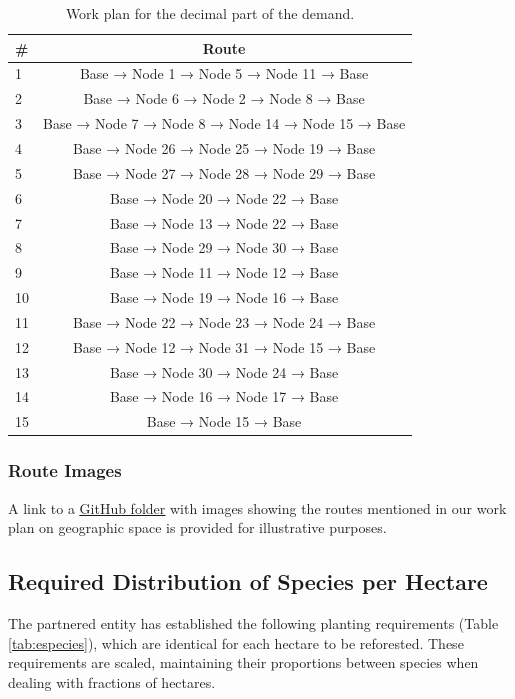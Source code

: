 \documentclass{amsart}
\begin{document}
        
        \begin{table}[!htp]\centering
        \scriptsize
        \begin{tabular}{lc} \toprule
        \textbf{\#} & \textbf{Route} \\\midrule
        1 & Base → Node 1 → Node 5 → Node 11 → Base \\
        2 & Base → Node 6  → Node 2 → Node 8 → Base \\
        3 & Base → Node 7 → Node 8 → Node 14 → Node 15 → Base \\
        4 & Base → Node 26 → Node 25 → Node 19 → Base \\
        5 & Base → Node 27 → Node 28 → Node 29 → Base \\
        6 & Base → Node 20 → Node 22 → Base \\
        7 & Base → Node 13 → Node 22 → Base \\
        8 & Base → Node 29 → Node 30 → Base \\
        9 & Base → Node 11 → Node 12 → Base \\
        10 & Base → Node 19 → Node 16 → Base \\
        11 & Base → Node 22 → Node 23 → Node 24 → Base \\
        12 & Base → Node 12 → Node 31 → Node 15 → Base \\
        13 & Base → Node 30 → Node 24 → Base \\
        14 & Base → Node 16 → Node 17 → Base \\
        15 & Base → Node 15 → Base \\
        \bottomrule
        \end{tabular}
        \vspace{10pt}
        \caption{Work plan for the decimal part of the demand.}\label{tab:ParteDecimal}
    \end{table}
        
            \subsubsection{Route Images}
            A link to a \href{https://github.com/JuanjoBelt/VRP-ReforestationTransportLogistics/tree/5030293089820a896e177f198d9ab7f23ada59e7/Resources/RouteImages}{\underline{GitHub folder}} with images showing the routes mentioned in our work plan on geographic space is provided for illustrative purposes.
        
        \subsection{Required Distribution of Species per Hectare}
        The partnered entity has established the following planting requirements (Table \ref{tab:especies}), which are identical for each hectare to be reforested. These requirements are scaled, maintaining their proportions between species when dealing with fractions of hectares.
        
\end{document}

